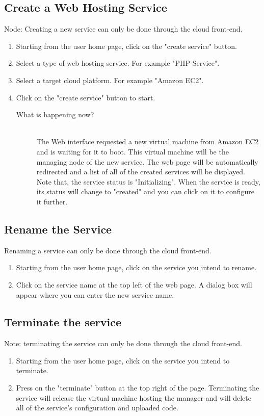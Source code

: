 \documentclass[10pt]{article}
\newenvironment{what}
{\begin{description} \item [What is happening now?] \hfill \\}
{\end{description}}
\begin{document}
\subsection{Create a Web Hosting Service}
Node: Creating a new service can only be done through the cloud front-end. 
\begin{enumerate}
\item Starting from the user home page, click on the "create service" button.
\item Select a type of web hosting service. For example "PHP Service".
\item Select a target cloud platform. For example "Amazon EC2".
\item Click on the "create service" button to start.
 \begin{what}
  The Web interface requested a new virtual machine from Amazon EC2 and
  is waiting for it to boot. This virtual machine will be the managing
  node of the new service. The web page will be automatically redirected
  and a list of all of the created services will be displayed.
  Note that, the service status is "Initializing". When the service is
  ready, its status will change to "created" and you can click on it to
  configure it further.
 \end{what}
\end{enumerate}

\subsection{Rename the Service}
Renaming a service can only be done through the cloud front-end. 
\begin{enumerate}
\item Starting from the user home page, click on the service you intend to
      rename.
\item Click on the service name at the top left of the web
      page. A dialog box will appear where you can enter the new service
      name.
\end{enumerate}

\subsection{Terminate the service}
Note: terminating the service can only be done through the cloud front-end.
\begin{enumerate}
\item Starting from the user home page, click on the service you intend to
      terminate.
\item Press on the "terminate" button at the top right of the page.
      Terminating the service will release the virtual machine hosting
      the manager and will delete all of the service's configuration and
      uploaded code.
\end{enumerate}
\end{document}
